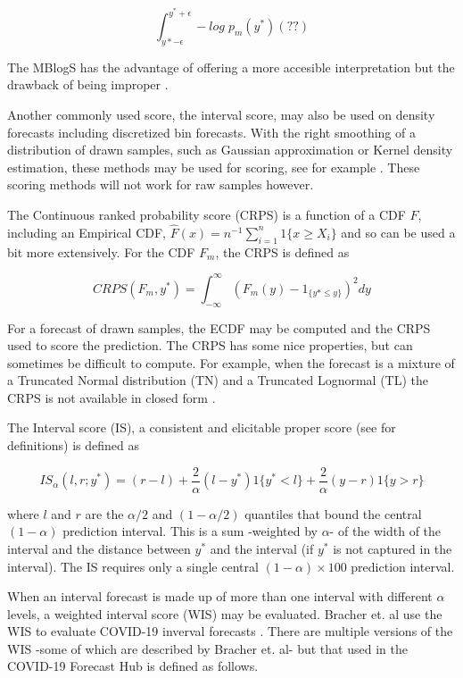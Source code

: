 \documentclass{article}\usepackage[]{graphicx}\usepackage[]{color}
\begin{document}
\begin{equation}
  \int_{y*-\epsilon}^{y^*+\epsilon} -log\;p_m(y^*) (??)
\end{equation}

The MBlogS has the advantage of offering a more accesible interpretation but the
drawback of being improper \cite{bracher2021evaluating}.

Another commonly used score, the interval score, may also be used on density 
forecasts including discretized bin forecasts. With the right smoothing of
a distribution of drawn samples, 
such as Gaussian approximation or Kernel density estimation, these methods may 
be used for scoring, see for example \cite{krueger2016probabilistic}.
These scoring methods will not work for raw samples however.

The Continuous ranked probability score (CRPS) is a function of a CDF $F$, 
including an Empirical CDF, $\hat{F}(x) = n^{-1} \sum_{i=1}^n 1\{x \geq X_i\}$
and so 
can be used a bit more extensively. For the CDF $F_m$, the CRPS is defined as

\begin{equation}
  CRPS(F_m, y^*) = \int_{-\infty}^{\infty} (F_m(y) - 1_{\{y*\leq y\}})^2 dy
\end{equation}

For a forecast of drawn samples, the ECDF may be computed and the CRPS used to 
score the prediction. The CRPS has some nice properties, but can sometimes be
difficult to compute. For example, when the forecast is a mixture of a 
Truncated Normal distribution (TN) and a Truncated Lognormal (TL) the CRPS is 
not available in closed form \cite{baran2018combining}.

The Interval score (IS), a consistent and elicitable proper score 
(see \cite{gneiting2014probabilistic} for definitions) is defined as 

\begin{equation}
  IS_{\alpha}(l,r; y^*) = (r-l) + \frac{2}{\alpha}(l-y^*)1\{y^*<l\} 
  + \frac{2}{\alpha}(y-r)1\{y>r\}
\end{equation}

where $l$ and $r$ are the $\alpha/2$ and $(1-\alpha/2)$ quantiles that bound
the central $(1-\alpha)$ prediction interval. This is a sum -weighted by 
$\alpha$- of the width of the
interval and the distance between $y^*$ and the interval (if $y^*$ is not 
captured in the interval). The IS requires only a single central 
$(1-\alpha) \times 100$ prediction interval.

When an interval forecast is made up of more than one interval with different
$\alpha$ levels, a weighted interval score (WIS) may be evaluated. Bracher et.
al use the WIS to evaluate COVID-19 inverval forecasts 
\cite{bracher2021evaluating}. There are multiple versions of the WIS -some of 
which are described by Bracher et. al- but that used in the COVID-19 Forecast
Hub is defined as follows.
\end{document}

